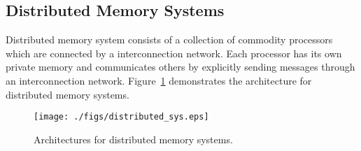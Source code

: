 \subsection{Distributed Memory Systems}
Distributed memory system consists of a collection of commodity processors which are connected by a interconnection network. Each processor has its own private memory and communicates others by explicitly sending messages through an interconnection network. Figure~\ref{fig:dist_sys} demonstrates the architecture for distributed memory systems.  
\begin{figure}[!h]
      \centering
        \texttt{[image: ./figs/distributed\_sys.eps]}
      \caption{Architectures for distributed memory systems.}
        \label{fig:dist_sys}
\end{figure}


